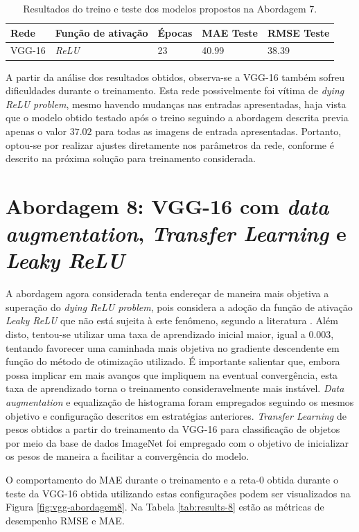 \begin{table}[!ht]
	\centering
	\caption{Resultados do treino e teste dos modelos propostos na Abordagem 7.}
	\label{tab:results-7}
		\begin{tabular}{l l l l l }
			\toprule
			Rede & Função de ativação & Épocas & MAE Teste & RMSE Teste \\
			\midrule
			VGG-16 & \emph{ReLU} & 23 & 40.99 & 38.39 \\
			\bottomrule
		\end{tabular}
	\end{table}

	A partir da análise dos resultados obtidos, observa-se a VGG-16 também sofreu dificuldades durante o treinamento. Esta rede possivelmente foi vítima de \emph{dying ReLU problem}, mesmo havendo mudanças nas entradas apresentadas, haja vista que o modelo obtido testado após o treino seguindo a abordagem descrita previa apenas o valor $37.02$ para todas as imagens de entrada apresentadas. Portanto, optou-se por realizar ajustes diretamente nos parâmetros da rede, conforme é descrito na próxima solução para treinamento considerada.

\section{Abordagem 8: VGG-16 com \emph{data augmentation}, \emph{Transfer Learning} e \emph{Leaky ReLU}}

 A abordagem agora considerada tenta endereçar de maneira mais objetiva a superação do \emph{dying ReLU problem}, pois considera a adoção da função de ativação \emph{Leaky ReLU} que não está sujeita à este fenômeno, segundo a literatura \cite{djork2015elus}. Além disto, tentou-se utilizar uma taxa de aprendizado inicial maior, igual a $0.003$, tentando favorecer uma caminhada mais objetiva no gradiente descendente em função do método de otimização utilizado. É importante salientar que, embora possa implicar em mais avanços que impliquem na eventual convergência, esta taxa de aprendizado torna o treinamento consideravelmente mais instável. \emph{Data augmentation} e equalização de histograma foram empregados seguindo os mesmos objetivo e configuração descritos em estratégias anteriores. \emph{Transfer Learning} de pesos obtidos a partir do treinamento da VGG-16 para classificação de objetos por meio da base de dados ImageNet foi empregado com o objetivo de inicializar os pesos de maneira a facilitar a convergência do modelo.

 O comportamento do MAE durante o treinamento e a reta-0 obtida durante o teste da VGG-16 obtida utilizando estas configurações podem ser visualizados na Figura \ref{fig:vgg-abordagem8}. Na Tabela \ref{tab:results-8} estão as métricas de desempenho RMSE e MAE.

